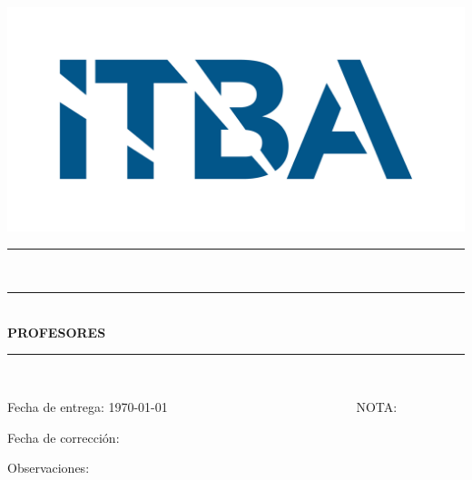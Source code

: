 
\begin{titlepage}
    \begin{center}
        \includegraphics[width=0.4\linewidth]{imagenes/logoITBA.png}\\
         \vspace{-0.5cm}
        \textbf{\huge{\universidad}}
        
        \Large{\carrera}
        
         \vspace{-0.3cm}
        \LARGE{\materia}
        
        \vspace{-0.8cm}
        \rule{10cm}{0.01cm}\\
        \LARGE{\textbf{\unidad}}
        
        \vspace{-0.3cm}
        
        \Large{\titulo}
        
     \vspace{-0.3cm}
        \normalsize
        \rule{10cm}{0.01cm}\\
        \vspace{0.3cm}
        \autores
        \vspace{0.1cm}
        \textbf{PROFESORES}\\
        \profesores
        \rule{10cm}{0.01cm}\\
        
        
\end{center}
    \noindent
    \hspace{30pt}Fecha de entrega: \today ~~~~~~~~~~~~~~~~~~~~~~~~~~~~~ NOTA:
    
    \noindent
    \hspace{30pt}Fecha de corrección:
    
    \noindent
    \hspace{30pt}Observaciones: 
        
    
\end{titlepage}